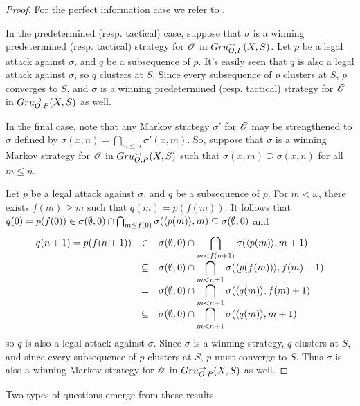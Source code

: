 \begin{proof}
  For the perfect information case we refer to \cite{MR0413049}.

  In the predetermined (resp. tactical) case, suppose that $\sigma$ is a
  winning predetermined (resp. tactical) strategy for $\mathscr{O}$ in
  $Gru_{O,P}^{\leadsto}(X,S)$. Let $p$ be a legal attack against $\sigma$, and $q$ be a
  subsequence of $p$. It's easily seen that $q$ is also a legal attack against
  $\sigma$, so $q$ clusters at $S$. Since every subsequence of $p$ clusters
  at $S$, $p$ converges to $S$, and $\sigma$ is a winning predetermined
  (resp. tactical) strategy for $\mathscr{O}$ in $Gru_{O,P}^{\to}(X,S)$ as well.

  In the final case, note that any Markov strategy $\sigma'$ for $\mathscr{O}$ may
  be strengthened to $\sigma$ defined by
  $\sigma(x,n)=\bigcap_{m\leq n}\sigma'(x,m)$.
  So, suppose that $\sigma$ is a winning Markov strategy for $\mathscr{O}$ in
  $Gru_{O,P}^{\leadsto}(X,S)$ such that $\sigma(x,m)\supseteq\sigma(x,n)$ for all
  $m\leq n$.

  Let $p$ be a legal attack against $\sigma$, and $q$ be a subsequence of $p$.
  For $m<\omega$, there exists $f(m)\geq m$ such that $q(m)=p(f(m))$. It follows
  that
    $
      q(0)=p(f(0))
        \in
      \sigma(\emptyset,0)\cap \bigcap_{m\leq f(0)}\sigma(\langle p(m)\rangle,m)
        \subseteq
      \sigma(\emptyset,0)
    $
  and
    \[
      \begin{array}{rcl}
        q(n+1)=p(f(n+1)) &
          \in &
        \displaystyle
        \sigma(\emptyset,0)\cap \bigcap_{m<f(n+1)}\sigma(\langle p(m)\rangle,m+1) \\ &
          \subseteq &
        \displaystyle
        \sigma(\emptyset,0)\cap \bigcap_{m<n+1}\sigma(\langle p(f(m))\rangle,f(m)+1) \\ &
          = &
        \displaystyle
        \sigma(\emptyset,0)\cap \bigcap_{m<n+1}\sigma(\langle q(m)\rangle,f(m)+1) \\ &
          \subseteq &
        \displaystyle
        \sigma(\emptyset,0)\cap \bigcap_{m<n+1}\sigma(\langle q(m)\rangle,m+1)
      \end{array}
    \]
  so $q$ is also a legal attack against $\sigma$. Since $\sigma$ is a winning
  strategy, $q$ clusters at $S$, and since every subsequence of $p$ clusters
  at $S$, $p$ must converge to $S$. Thus $\sigma$ is also a winning Markov
  strategy for $\mathscr{O}$ in $Gru_{O,P}^{\to}(X,S)$ as well.
\end{proof}

Two types of questions emerge from these results.

